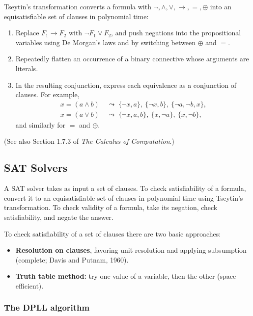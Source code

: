 Tseytin's transformation converts a formula with $\neg, \wedge, \vee, \rightarrow, =, \oplus$ into an equisatisfiable set of clauses in polynomial time:
\begin{enumerate}
  \item Replace $F_1 \rightarrow F_2$ with $\neg F_1 \vee F_2$, and push negations into the propositional variables using De Morgan's laws and by switching between $\oplus$ and $=$.
  \item Repeatedly flatten an occurrence of a binary connective whose arguments are literals.
  \item In the resulting conjunction, express each equivalence as a conjunction of clauses. For example,
  \begin{align*}
  x = (a \wedge b) &\;\leadsto\; \{\neg x, a\},\ \{\neg x, b\},\ \{\neg a, \neg b, x\},\\
  x = (a \vee b) &\;\leadsto\; \{\neg x, a, b\},\ \{x, \neg a\},\ \{x, \neg b\},
  \end{align*}
  and similarly for $=$ and $\oplus$.
\end{enumerate}
(See also Section 1.7.3 of \emph{The Calculus of Computation}.)
 
\subsection{SAT Solvers}
 
A SAT solver takes as input a set of clauses. To check satisfiability of a formula, convert it to an equisatisfiable set of clauses in polynomial time using Tseytin's transformation. To check validity of a formula, take its negation, check satisfiability, and negate the answer.
 
To check satisfiability of a set of clauses there are two basic approaches:
\begin{itemize}
  \item \textbf{Resolution on clauses}, favoring unit resolution and applying subsumption (complete; Davis and Putnam, 1960).
  \item \textbf{Truth table method:} try one value of a variable, then the other (space efficient).
\end{itemize}
 
\subsubsection*{The DPLL algorithm}
 

